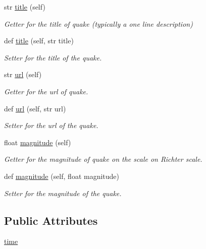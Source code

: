 \begin{DoxyCompactItemize}
str \mbox{\hyperlink{classbridges_1_1data__src__dependent_1_1earthquake__usgs_1_1_earthquake_u_s_g_s_acde728a34e0aea4271fe0a9c45919f80}{title}} (self)
\begin{DoxyCompactList}\small\item\em Getter for the title of quake (typically a one line description) \end{DoxyCompactList}\item 
def \mbox{\hyperlink{classbridges_1_1data__src__dependent_1_1earthquake__usgs_1_1_earthquake_u_s_g_s_a16a3995195fefc6b6095aa6913b5d759}{title}} (self, str title)
\begin{DoxyCompactList}\small\item\em Setter for the title of the quake. \end{DoxyCompactList}\item 
str \mbox{\hyperlink{classbridges_1_1data__src__dependent_1_1earthquake__usgs_1_1_earthquake_u_s_g_s_ae0b89e47a63edbfe3170100304b81a9c}{url}} (self)
\begin{DoxyCompactList}\small\item\em Getter for the url of quake. \end{DoxyCompactList}\item 
def \mbox{\hyperlink{classbridges_1_1data__src__dependent_1_1earthquake__usgs_1_1_earthquake_u_s_g_s_acc89cea8449d6c381f5feed9987df4da}{url}} (self, str url)
\begin{DoxyCompactList}\small\item\em Setter for the url of the quake. \end{DoxyCompactList}\item 
float \mbox{\hyperlink{classbridges_1_1data__src__dependent_1_1earthquake__usgs_1_1_earthquake_u_s_g_s_a3206dcb45c71bf5b704620411c24816d}{magnitude}} (self)
\begin{DoxyCompactList}\small\item\em Getter for the magnitude of quake on the scale on Richter scale. \end{DoxyCompactList}\item 
def \mbox{\hyperlink{classbridges_1_1data__src__dependent_1_1earthquake__usgs_1_1_earthquake_u_s_g_s_a55f07609214405ae501f0d9431f58fa6}{magnitude}} (self, float magnitude)
\begin{DoxyCompactList}\small\item\em Setter for the magnitude of the quake. \end{DoxyCompactList}\end{DoxyCompactItemize}
\subsection*{Public Attributes}
\begin{DoxyCompactItemize}
\item 
\mbox{\hyperlink{classbridges_1_1data__src__dependent_1_1earthquake__usgs_1_1_earthquake_u_s_g_s_aacc317fa18e83353df6c8ffb3d47d6c1}{time}}
\end{DoxyCompactItemize}


